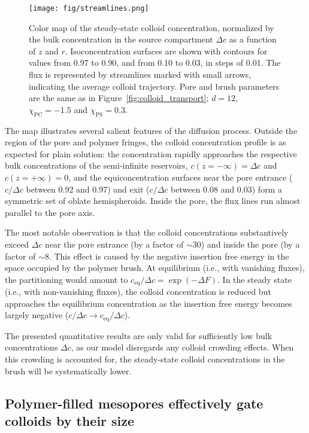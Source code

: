 \documentclass[12pt, a4paper]{article}
\begin{document}
\begin{figure}
    \centering
    \texttt{[image: fig/streamlines.png]}
    \caption{
    Color map of the steady-state colloid concentration, normalized by the bulk concentration in the source compartment $\Delta c$ as a function of $z$ and $r$.
    Isoconcentration surfaces are shown with contours for values from 0.97 to 0.90, and from 0.10 to 0.03, in steps of 0.01.
    The flux is represented by streamlines marked with small arrows, indicating the average colloid trajectory.
    Pore and brush parameters are the same as in Figure~\ref{fig:colloid_transport}; $d = 12$, $\chi_{\text{PC}} = -1.5$ and $\chi_{\text{PS}} = 0.3$.
    }
    \label{fig:colloid_concentration}
\end{figure}

The map illustrates several salient features of the diffusion process.
Outside the region of the pore and polymer fringes, the colloid concentration profile is as expected for plain solution: the concentration rapidly approaches the respective bulk concentrations of the semi-infinite reservoirs, $c(z = -\infty) = \Delta c$ and $c(z = +\infty) = 0$, and the equiconcentration surfaces near the pore entrance ($c/\Delta c$ between 0.92 and 0.97) and exit ($c/\Delta c$ between 0.08 and 0.03) form a symmetric set of oblate hemispheroids.
Inside the pore, the flux lines run almost parallel to the pore axis.

The most notable observation is that the colloid concentrations substantively exceed $\Delta c$ near the pore entrance (by a factor of $\sim30$) and inside the pore (by a factor  of $\sim8$.
This effect is caused by the negative insertion free energy in the space occupied by the polymer brush.
At equilibrium (i.e., with vanishing fluxes), the partitioning would amount to $c_{\text{eq}}/\Delta c = \exp\left( -\Delta F \right)$.
In the steady state (i.e., with non-vanishing fluxes), the colloid concentration is reduced but approaches the equilibrium concentration as the insertion free energy becomes largely negative ($c/\Delta c \to c_{\text{eq}}/\Delta c$).

The presented quantitative results are only valid for sufficiently low bulk concentrations $\Delta c$, as our model disregards any colloid crowding effects.
When this crowding is accounted for, the steady-state colloid concentrations in the brush will be systematically lower.


\subsection{Polymer-filled mesopores effectively gate colloids by their size}
\end{document}
